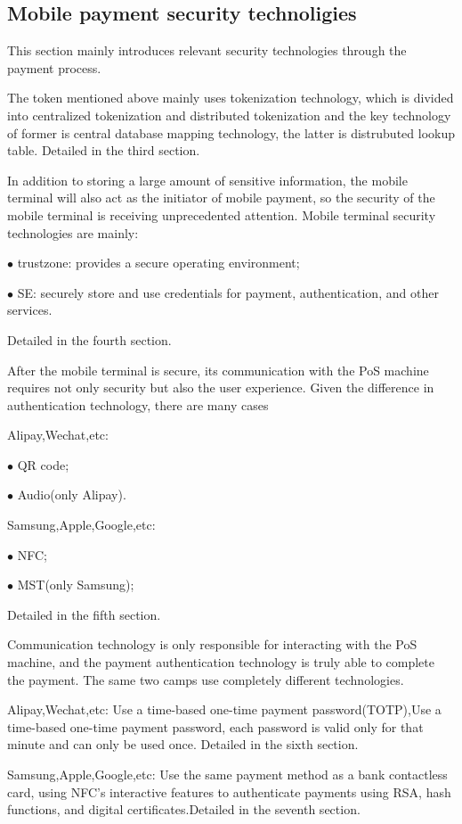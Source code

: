 \documentclass[journal]{IEEEtran}
\begin{document}
\subsection{Mobile payment security technoligies}
This section mainly introduces relevant security technologies through the payment process.


The token mentioned above mainly uses tokenization technology, which is divided into centralized tokenization and distributed tokenization and the key technology of former is central database mapping technology, the latter is distrubuted lookup table. Detailed in the third section.

In addition to storing a large amount of sensitive information, the mobile terminal will also act as the initiator of mobile payment, so the security of the mobile terminal is receiving unprecedented attention. Mobile terminal security technologies are mainly:
 
$\bullet$ trustzone: provides a secure operating environment;

$\bullet$ SE: securely store and use credentials for payment, authentication, and other services.

Detailed in the fourth section.


After the mobile terminal is secure, its communication with the PoS machine requires not only security but also the user experience. Given the difference in authentication technology, there are many cases

Alipay,Wechat,etc:

$\bullet$ QR code;

$\bullet$ Audio(only Alipay).

Samsung,Apple,Google,etc:

$\bullet$ NFC;

$\bullet$ MST(only Samsung);

Detailed in the fifth section.

Communication technology is only responsible for interacting with the PoS machine, and the payment authentication technology is truly able to complete the payment. The same two camps use completely different technologies.

Alipay,Wechat,etc: Use a time-based one-time payment password(TOTP),Use a time-based one-time payment password, each password is valid only for that minute and can only be used once. Detailed in the sixth section.

Samsung,Apple,Google,etc: Use the same payment method as a bank contactless card, using NFC's interactive features to authenticate payments using RSA, hash functions, and digital certificates.Detailed in the seventh section.
\end{document}
